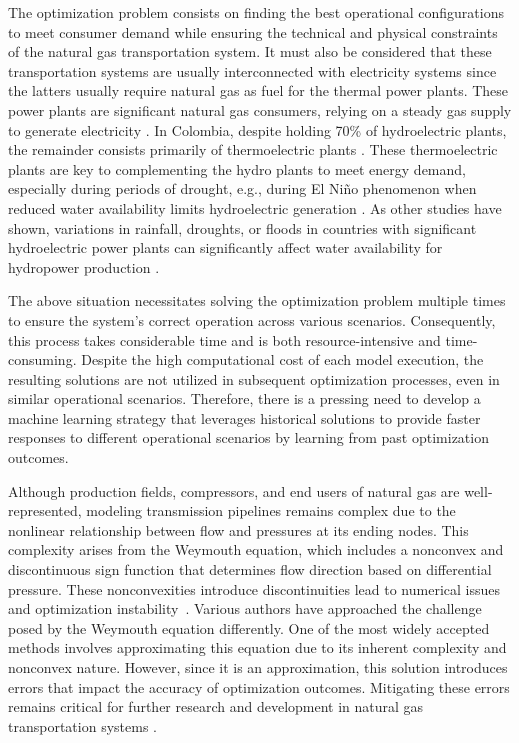 The optimization problem consists on finding the best operational configurations to meet consumer demand while ensuring the technical and physical constraints of the natural gas transportation system.  It must also be considered that these transportation systems are usually interconnected with electricity systems since the latters usually require natural gas as fuel for the thermal power plants. These power plants are significant natural gas consumers, relying on a steady gas supply to generate electricity \cite{Byeon_Van_Hentenryck_2020}. In Colombia, despite holding 70\% of hydroelectric plants, the remainder consists primarily of thermoelectric plants \cite{Morcillo_Angulo_Franco_2020a}. These thermoelectric plants are key to complementing the hydro plants to meet energy demand, especially during periods of drought, e.g., during El Niño phenomenon when reduced water availability limits hydroelectric generation \cite{droughts_colombia}. As other studies have shown, variations in rainfall, droughts, or floods in countries with significant hydroelectric power plants can significantly affect water availability for hydropower production \cite{Cuartas_Cunha_Alves_Parra_Deusdará_Leal_Costa_Molina_Amore_Broedel_Seluchi_et_al_2022}. 

The above situation necessitates solving the optimization problem multiple times to ensure the system's correct operation across various scenarios. Consequently, this process takes considerable time and is both resource-intensive and time-consuming. Despite the high computational cost of each model execution, the resulting solutions are not utilized in subsequent optimization processes, even in similar operational scenarios. Therefore, there is a pressing need to develop a machine learning strategy that leverages historical solutions to provide faster responses to different operational scenarios by learning from past optimization outcomes.

Although production fields, compressors, and end users of natural gas are well-represented, modeling transmission pipelines remains complex due to the nonlinear relationship between flow and pressures at its ending nodes. This complexity arises from the Weymouth equation, which includes a nonconvex and discontinuous sign function that determines flow direction based on differential pressure. These nonconvexities introduce discontinuities lead to numerical issues and optimization instability~\cite{YANG2020106023, JIANG2021106460}. Various authors have approached the challenge posed by the Weymouth equation differently. One of the most widely accepted methods involves approximating this equation due to its inherent complexity and nonconvex nature. However, since it is an approximation, this solution introduces errors that impact the accuracy of optimization outcomes. Mitigating these errors remains critical for further research and development in natural gas transportation systems \cite{review}.


